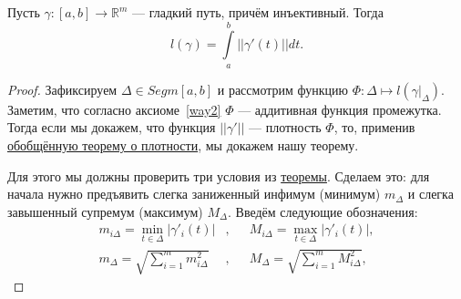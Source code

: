 \begin{theorem}
	Пусть \(\gamma \colon [a, b] \to \mathbb{R}^m\) --- гладкий путь, причём инъективный. Тогда \[
	l(\gamma) = \int\limits_a^b ||\gamma'(t)|| dt.
	\]
\end{theorem}

\begin{proof}
	Зафиксируем \(\Delta \in Segm [a, b]\) и рассмотрим функцию \(\Phi \colon \Delta \mapsto l(\gamma |_\Delta)\). Заметим, что согласно аксиоме~\ref{way2} \(\Phi\) --- аддитивная функция промежутка. Тогда если мы докажем, что функция \(||\gamma'||\) --- плотность \(\Phi\), то, применив \hyperlink{plotn}{обобщённую теорему о плотности}, мы докажем нашу теорему.
	
	Для этого мы должны проверить три условия из \hyperlink{plotn}{теоремы}. Сделаем это: для начала нужно предъявить слегка заниженный инфимум (минимум) \(m_\Delta\) и слегка завышенный супремум (максимум) \(M_\Delta\). Введём следующие обозначения:
	\begin{align*}
		m_{i\Delta} = \min\limits_{t \in \Delta} |\gamma'_i (t)|&, &&M_{i\Delta} = \max\limits_{t \in \Delta} |\gamma'_i (t)|, \\
		m_\Delta = \sqrt{\sum\limits_{i = 1}^m m_{i\Delta}^2}&, &&M_\Delta = \sqrt{\sum\limits_{i = 1}^m M_{i\Delta}^2},
	\end{align*}
	

\end{proof}
